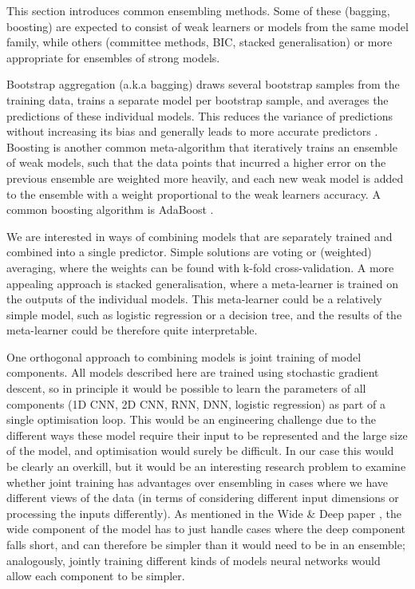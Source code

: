 This section  introduces common ensembling methods.
Some of these (bagging, boosting)  are expected to consist of weak learners or models from the same model family, while others (committee methods, BIC, stacked generalisation) or more appropriate for ensembles of strong models.

Bootstrap aggregation (a.k.a bagging)   draws several bootstrap samples  from the training data,  trains a separate model per bootstrap sample,  and averages the predictions of these individual models.  This reduces the variance of predictions without increasing its bias and generally leads to  more accurate predictors \cite{bagging}.
Boosting is another common meta-algorithm that iteratively trains an ensemble of weak models, such that the data points that incurred a higher error on the previous ensemble are weighted more heavily, and each new weak model is added to the ensemble with a weight proportional to the weak learners accuracy.
A common boosting algorithm is AdaBoost \cite{adaboost}.

We are interested in ways of combining models that are separately trained and combined into a single predictor.
Simple solutions are voting or (weighted) averaging, where the weights can be found with k-fold cross-validation.
A more appealing approach is stacked generalisation, where a meta-learner is trained on the outputs of the individual models.
This meta-learner could be a relatively simple model, such as logistic regression or a decision tree, and the results of the meta-learner could be therefore quite interpretable.

One orthogonal approach to combining models is joint training of model components.
All models described here are trained using stochastic gradient descent, so in principle it would be possible to learn the parameters of all components (1D CNN, 2D CNN, RNN, DNN, logistic regression) as part of a single optimisation loop.
This would be an engineering challenge due to the different ways these model require their input to be represented and the large size of the model, and optimisation would surely be difficult.
In our case this would be clearly an overkill, but it would be an interesting research problem to examine whether joint training has advantages over ensembling in cases where we have different views of the data (in terms of considering different input dimensions or processing the inputs differently).
As mentioned in the Wide \& Deep paper \cite{wide_deep}, the wide component of the model has to just handle cases where the deep component falls short, and can therefore be simpler than it would need to be in an ensemble; analogously, jointly training different kinds of models neural networks would allow each component to be simpler.

